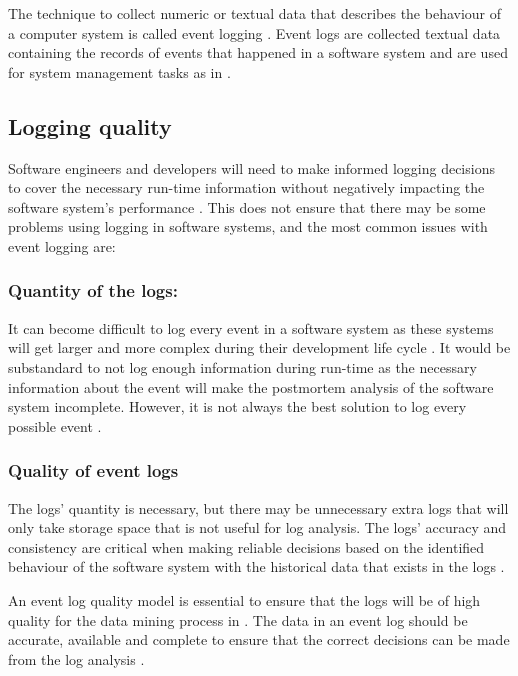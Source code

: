 The technique to collect numeric or textual data that describes the behaviour of a computer system is called event logging \cite{Pecchia2015, Baccanico2014}. Event logs are collected textual data containing the records of events that happened in a software system and are used for system management tasks as in  \cite{Rong2018a, Rong2018, Baccanico2014}.

\clearpage


\subsection{Logging quality}\label{sec:ch1_loggingQuality}

Software engineers and developers will need to make informed logging decisions to cover the necessary run-time information without negatively impacting the software system's performance \cite{Zhu2015, Zhu2019, Kherbouche2017}. This does not ensure that there may be some problems using logging in software systems, and the most common issues with event logging are:

\subsubsection{Quantity of the logs:} 
It can become difficult to log every event in a software system as these systems will get larger and more complex during their development life cycle \cite{Stojanov2017}. It would be substandard to not log enough information during run-time as the necessary information about the event will make the postmortem analysis of the software system incomplete. However, it is not always the best solution to log every possible event \cite{Zhu2015, Jans2012}.

\subsubsection{Quality of event logs} 
The logs' quantity is necessary, but there may be unnecessary extra logs that will only take storage space that is not useful for log analysis. The logs' accuracy and consistency are critical when making reliable decisions based on the identified behaviour of the software system with the historical data that exists in the logs \cite{Stojanov2017, Kherbouche2017}.\par An event log quality model is essential to ensure that the logs will be of high quality for the data mining process in . The data in an event log should be accurate, available and complete to ensure that the correct decisions can be made from the log analysis \cite{Kherbouche2017, VanDerAalst2011}.

